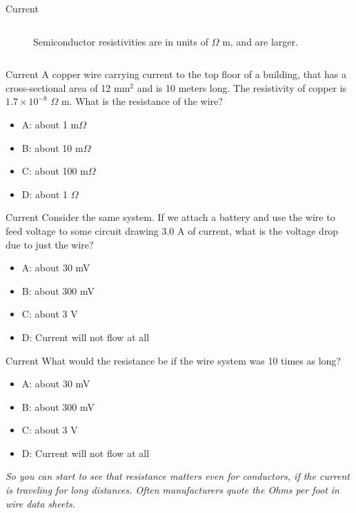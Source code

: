 \documentclass{beamer}
\begin{document}
\begin{frame}{Current}
\begin{columns}[T]
\begin{column}{0.5\textwidth}
\begin{figure}
\caption{\label{fig:rho2} Semiconductor resistivities are in units of $\Omega$ m, and are larger.}
\end{figure}
\end{column}
\end{columns}
\end{frame}

\begin{frame}{Current}
A copper wire carrying current to the top floor of a building, that has a cross-sectional area of 12 mm$^2$ and is 10 meters long.  The resistivity of copper is $1.7 \times 10^{-8}$ $\Omega$ m.  What is the resistance of the wire?
\begin{itemize}
\item A: about 1 m$\Omega$
\item B: about 10 m$\Omega$
\item C: about 100 m$\Omega$
\item D: about 1 $\Omega$
\end{itemize}
\end{frame}

\begin{frame}{Current}
Consider the same system.  If we attach a battery and use the wire to feed voltage to some circuit drawing 3.0 A of current, what is the voltage drop due to just the wire?
\begin{itemize}
\item A: about 30 mV
\item B: about 300 mV
\item C: about 3 V
\item D: Current will not flow at all
\end{itemize}
\end{frame}

\begin{frame}{Current}
What would the resistance be if the wire system was 10 times as long?
\begin{itemize}
\item A: about 30 mV
\item B: about 300 mV
\item C: about 3 V
\item D: Current will not flow at all
\end{itemize}
\textit{So you can start to see that resistance matters even for conductors, if the current is traveling for long distances.  Often manufacturers quote the Ohms per foot in wire data sheets.}
\end{frame}
\end{document}
